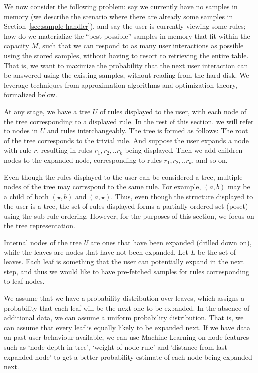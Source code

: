 {We now consider the following problem: say we currently have no
samples in memory (we describe the scenario where there are already 
some samples in Section~\ref{sec:sample-handler}), and say the user is currently viewing some rules; how do we
materialize the ``best possible'' samples in memory that fit within the capacity $M$,
such that we can respond to as many user interactions as possible using the stored samples,
without having to resort to retrieving the entire table.
That is, we want to maximize the probability that the next user interaction
can be answered using the existing samples, without reading from the hard disk. 
We leverage techniques from approximation algorithms and optimization theory, formalized
below.


At any stage, we have a tree $U$ of rules displayed to the user, 
with each node of the tree corresponding to a displayed rule. 
In the rest of this section, we will refer to nodes in $U$ and rules interchangeably.
The tree is formed as follows: The root of the tree corresponds to the trivial rule. 
And suppose the user expands a node with rule $r$, resulting in rules $r_1, r_2, .. r_k$ being displayed. 
Then we add children nodes to the expanded node, corresponding to rules $r_1, r_2, .. r_k$, and so on.

Even though the rules displayed to the user can be considered a tree, 
multiple nodes of the tree may correspond to the same rule. 
For example, $(a, b)$ may be a child of both $(\star, b)$ and $(a, \star)$.
Thus, even though the structure displayed to the user is a tree, 
the set of rules displayed forms a partially ordered set (poset) using the sub-rule ordering. 
However, for the purposes of this section, we focus on the tree representation.


Internal nodes of the tree $U$ are ones that have been expanded (drilled down on), 
while the leaves are nodes that have not been expanded. 
Let $L$ be the set of leaves. 
Each leaf is something that the user can potentially expand in the next step, and thus we would like to have pre-fetched samples for rules corresponding to leaf nodes.

We assume that we have a probability distribution over leaves, which assigns a probability that each leaf will be the next one to be expanded. In the absence of additional data, we can assume a uniform probability distribution. That is, we can assume that every leaf is equally likely to be expanded next. If we have data on past user behaviour available, we can use Machine Learning on node features such as `node depth in tree', `weight of node rule' and `distance from last expanded node' to get a better probability estimate of each node being expanded next. 


}
